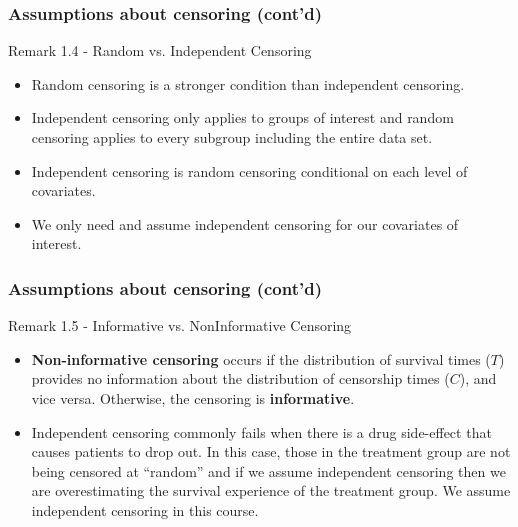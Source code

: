 \documentclass{beamer}
\theoremstyle{definition}
\begin{document}
\begin{frame}
\frametitle{Assumptions about censoring (cont'd)}
\begin{block}{Remark 1.4 - Random vs. Independent Censoring}
\begin{itemize}
\item Random censoring is a stronger condition than independent censoring.
\item Independent censoring only applies to groups of interest and random censoring applies to every subgroup including the entire data set.
\item Independent censoring is random censoring conditional on each level of covariates.
\item We only need and assume independent censoring for our covariates of interest.
\end{itemize}
\end{block}
\end{frame}


\begin{frame}
\frametitle{Assumptions about censoring (cont'd)}
\begin{block}{Remark 1.5 - Informative vs. NonInformative Censoring}
\begin{itemize}
\item \textbf{ Non-informative censoring} occurs if the distribution of survival times ($T$) provides no
information about the distribution of censorship times ($C$), and vice versa. Otherwise, the
censoring is \textbf{informative}.
\item Independent censoring commonly fails when there is a drug side-effect that causes patients to drop out. In this case, those in the treatment group are not being censored at ``random'' and if we assume independent censoring then we are overestimating the survival experience of the treatment group. We assume independent censoring in this course.
\end{itemize}
\end{block}
\end{frame}
\end{document}
